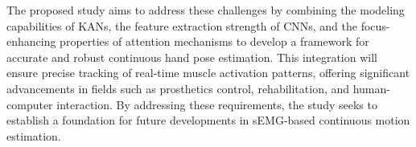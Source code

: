 The proposed study aims to address these challenges by combining the modeling capabilities of KANs, the feature extraction strength of CNNs, and the focus-enhancing properties of attention mechanisms to develop a framework for accurate and robust continuous hand pose estimation. This integration will ensure precise tracking of real-time muscle activation patterns, offering significant advancements in fields such as prosthetics control, rehabilitation, and human-computer interaction. By addressing these requirements, the study seeks to establish a foundation for future developments in sEMG-based continuous motion estimation.
